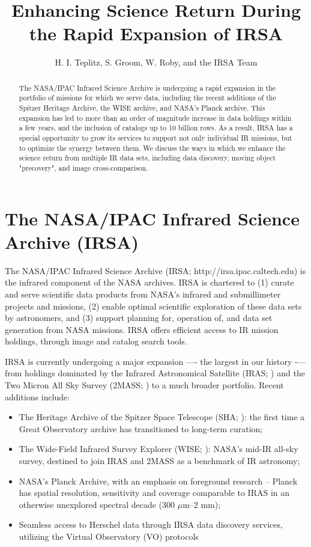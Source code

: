 \documentclass[11pt,twoside]{article}
\begin{document}
\title{Enhancing Science Return During the Rapid Expansion of IRSA}
\author{H. I. Teplitz, S. Groom, W. Roby, and the IRSA Team
}

\begin{abstract}
  The NASA/IPAC Infrared Science Archive is undergoing a rapid
  expansion in the portfolio of missions for which we serve data,
  including the recent additions of the Spitzer Heritage Archive, the
  WISE archive, and NASA's Planck archive. This expansion has led to
  more than an order of magnitude increase in data holdings within a
  few years, and the inclusion of catalogs up to 10 billion rows. As a
  result, IRSA has a special opportunity to grow its services to
  support not only individual IR missions, but to optimize the synergy
  between them. We discuss the ways in which we enhance the science
  return from multiple IR data sets, including data discovery, moving
  object "precovery", and image cross-comparison.
\end{abstract}

\section{The NASA/IPAC Infrared Science Archive (IRSA)}

The NASA/IPAC Infrared Science Archive (IRSA;
http://irsa.ipac.caltech.edu) is the infrared component of the NASA
archives. IRSA is chartered to (1) curate and serve scientific data
products from NASA’s infrared and submillimeter projects and missions,
(2) enable optimal scientific exploration of these data sets by
astronomers, and (3) support planning for, operation of, and data set
generation from NASA missions. IRSA offers efficient access to IR
mission holdings, through image and catalog search tools. 

IRSA is currently undergoing a major expansion —- the largest in our
history -— from holdings dominated by the Infrared Astronomical Satellite
(IRAS; \citep{neugebauer84}) and the Two Micron All Sky Survey
(2MASS; \citep{skrutskie06}) to a much broader
portfolio. Recent additions include:

\begin{itemize}

\item The Heritage Archive of the Spitzer Space Telescope (SHA; \citep{werner04}): the first time a
  Great Observatory archive has transitioned to long-term curation; 
\item The Wide-Field Infrared Survey Explorer (WISE; \citep{wright10}): NASA’s mid-IR all-sky survey, destined to
  join IRAS and 2MASS as a benchmark of IR astronomy; 
\item NASA's Planck Archive, with an emphasis on foreground research
  -- Planck \citet{planck11} has spatial resolution, sensitivity and coverage
  comparable to IRAS in an otherwise unexplored spectral decade (300
  $\mu$m–2 mm); 
\item Seamless access to Herschel data through IRSA data discovery
  services, utilizing the Virtual Observatory (VO) protocols

\end{itemize}
\end{document}
